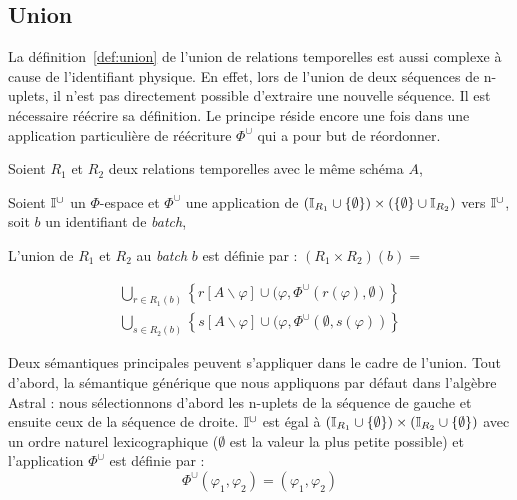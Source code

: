 \subsection{Union}
La définition~\ref{def:union} de l'union de relations temporelles est aussi complexe à cause de l'identifiant physique. En effet, lors de l'union de deux séquences de n-uplets, il n'est pas directement possible d'extraire une nouvelle séquence. Il est nécessaire réécrire sa définition. Le principe réside encore une fois dans une application particulière de réécriture $\Phi^\cup$ qui a pour but de réordonner.
\begin{defi}\label{def:union}
    Soient $R_1$ et $R_2$ deux relations temporelles avec le même schéma $A$,

    Soient $\mathbb{I}^{\cup}$ un $\Phi$-espace et $\Phi^\cup$ une application de $(\mathbb{I}_{R_1}\cup\{\emptyset\})\times(\{\emptyset\}\cup\mathbb{I}_{R_2})$ vers $\mathbb{I}^\cup$, soit $b$ un identifiant de \textit{batch},

    L'union de $R_1$ et $R_2$ au \textit{batch} $b$ est définie par : $(R_1\times R_2)(b)=$ 

        $$\begin{array}{c}
            \bigcup_{\scriptstyle r \in R_1(b)} \left\{ r[A\backslash \varphi] \cup (\varphi, \Phi^\cup(r(\varphi),\emptyset) \right\} \\
            \bigcup_{\scriptstyle s \in R_2(b)} \left\{ s[A\backslash \varphi] \cup (\varphi, \Phi^\cup(\emptyset,s(\varphi)) \right\}
        \end{array}$$
\end{defi}

Deux sémantiques principales peuvent s'appliquer dans le cadre de l'union. Tout d'abord, la sémantique générique que nous appliquons par défaut dans l'algèbre Astral : nous sélectionnons d'abord les n-uplets de la séquence de gauche et ensuite ceux de la séquence de droite. $\mathbb{I}^\cup$ est égal à $(\mathbb{I}_{R_1}\cup \{\emptyset\})\times (\mathbb{I}_{R_2}\cup \{\emptyset\})$ avec un ordre naturel lexicographique ($\emptyset$ est la valeur la plus petite possible) et l'application $\Phi^\cup$ est définie par : $$\Phi^\cup(\varphi_1,\varphi_2) = (\varphi_1,\varphi_2)$$

